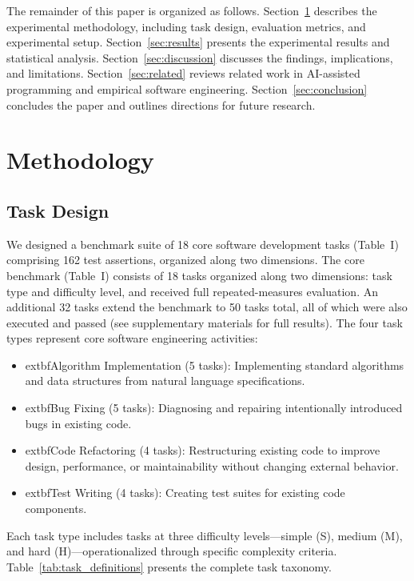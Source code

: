 \documentclass[conference]{IEEEtran}
\begin{document}
The remainder of this paper is organized as follows. Section~\ref{sec:methodology} describes the experimental methodology, including task design, evaluation metrics, and experimental setup. Section~\ref{sec:results} presents the experimental results and statistical analysis. Section~\ref{sec:discussion} discusses the findings, implications, and limitations. Section~\ref{sec:related} reviews related work in AI-assisted programming and empirical software engineering. Section~\ref{sec:conclusion} concludes the paper and outlines directions for future research.

\section{Methodology}
\label{sec:methodology}

\subsection{Task Design}

We designed a benchmark suite of 18 core software development tasks (Table~I) comprising 162 test assertions, organized along two dimensions. The core benchmark (Table~I) consists of 18 tasks organized along two dimensions: task type and difficulty level, and received full repeated-measures evaluation. An additional 32 tasks extend the benchmark to 50 tasks total, all of which were also executed and passed (see supplementary materials for full results). The four task types represent core software engineering activities:

\begin{itemize}[leftmargin=*]
 \item 			extbf{Algorithm Implementation (5 tasks):} Implementing standard algorithms and data structures from natural language specifications.
 \item 			extbf{Bug Fixing (5 tasks):} Diagnosing and repairing intentionally introduced bugs in existing code.
 \item 			extbf{Code Refactoring (4 tasks):} Restructuring existing code to improve design, performance, or maintainability without changing external behavior.
 \item 			extbf{Test Writing (4 tasks):} Creating test suites for existing code components.
\end{itemize}

Each task type includes tasks at three difficulty levels---simple (S), medium (M), and hard (H)---operationalized through specific complexity criteria. Table~\ref{tab:task_definitions} presents the complete task taxonomy.
\end{document}
